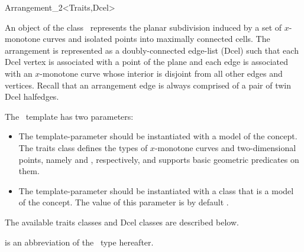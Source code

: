 
\ccRefPageBegin

\begin{ccRefClass}{Arrangement_2<Traits,Dcel>}
\label{arr_ref:arr}

\ccDefinition

An object  of the class \ccClassTemplateName\ represents the
planar subdivision induced by a set of $x$-monotone curves and isolated
points into maximally connected cells. The arrangement is represented as
a doubly-connected edge-list ({\sc Dcel}) such that each {\sc Dcel} vertex
is associated with a point of the plane and each edge is
associated with an $x$-monotone curve whose interior is disjoint from all
other edges and vertices. Recall that an arrangement
edge is always comprised of a pair of twin {\sc Dcel} halfedges.

The \ccClassTemplateName\ template has two parameters:
\begin{itemize}
\item The  template-parameter should be instantiated with
a model of the  concept. The traits
class defines the types of $x$-monotone curves and two-dimensional
points, namely  and ,
respectively, and supports basic geometric predicates on them.
\item The  template-parameter should be instantiated with
a class that is a model of the  concept. The
value of this parameter is by default
.
\end{itemize}
The available traits classes and {\sc Dcel} classes are described below. 

 is an abbreviation of the \ccRefName\ type hereafter.


\ccTypes

\ccThreeToTwo
{}
\ccGlue
{}

\ccThreeToTwo
{}


\end{ccRefClass}
